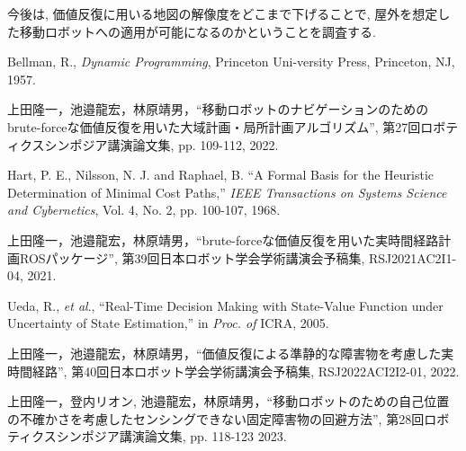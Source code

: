 \documentclass{jarticle}
\begin{document}
今後は, 価値反復に用いる地図の解像度をどこまで下げることで, 
屋外を想定した移動ロボットへの適用が可能になるのかということを調査する. 

\footnotesize
\begin{thebibliography}{99}

	Bellman, R., {\it Dynamic Programming}, Princeton Uni-versity Press, Princeton, NJ, 1957.

	上田隆一，池邉龍宏，林原靖男，``移動ロボットのナビゲーションのためのbrute-forceな価値反復を用いた大域計画・局所計画アルゴリズム'', 
	第27回ロボティクスシンポジア講演論文集, pp. 109-112, 2022.
	
	Hart, P. E., Nilsson, N. J. and Raphael, B. ``A Formal
	Basis for the Heuristic Determination of Minimal Cost
	Paths,'' {\it IEEE Transactions on Systems Science and Cybernetics}, Vol. 4, No. 2, pp. 100-107, 1968.
	
	上田隆一，池邉龍宏，林原靖男，``brute-forceな価値反復を用いた実時間経路計画ROSパッケージ'', 
	第39回日本ロボット学会学術講演会予稿集, RSJ2021AC2I1-04, 2021.

	Ueda, R., {\it et al}., ``Real-Time Decision Making with State-Value Function under Uncertainty of State Estimation,''
	 in {\it Proc. of} ICRA, 2005.

	上田隆一，池邉龍宏，林原靖男，``価値反復による準静的な障害物を考慮した実時間経路'', 
	第40回日本ロボット学会学術講演会予稿集, RSJ2022ACI2I2-01, 2022.

	上田隆一，登内リオン, 池邉龍宏，林原靖男，``移動ロボットのための自己位置の不確かさを考慮したセンシングできない固定障害物の回避方法'', 
	第28回ロボティクスシンポジア講演論文集, pp. 118-123 2023.

\end{thebibliography}

\normalsize
\end{document}
